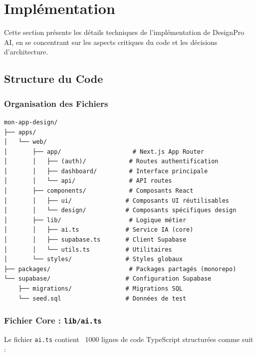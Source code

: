 \section{Implémentation}

Cette section présente les détails techniques de l'implémentation de DesignPro AI, en se concentrant sur les aspects critiques du code et les décisions d'architecture.

\subsection{Structure du Code}

\subsubsection{Organisation des Fichiers}

\begin{lstlisting}[caption=Structure du projet]
mon-app-design/
├── apps/
│   └── web/
│       ├── app/                    # Next.js App Router
│       │   ├── (auth)/            # Routes authentification
│       │   ├── dashboard/         # Interface principale
│       │   └── api/               # API routes
│       ├── components/            # Composants React
│       │   ├── ui/               # Composants UI réutilisables
│       │   └── design/           # Composants spécifiques design
│       ├── lib/                   # Logique métier
│       │   ├── ai.ts             # Service IA (core)
│       │   ├── supabase.ts       # Client Supabase
│       │   └── utils.ts          # Utilitaires
│       └── styles/               # Styles globaux
├── packages/                      # Packages partagés (monorepo)
└── supabase/                     # Configuration Supabase
    ├── migrations/               # Migrations SQL
    └── seed.sql                  # Données de test
\end{lstlisting}

\subsubsection{Fichier Core : \texttt{lib/ai.ts}}

Le fichier \texttt{ai.ts} contient ~1000 lignes de code TypeScript structurées comme suit :

